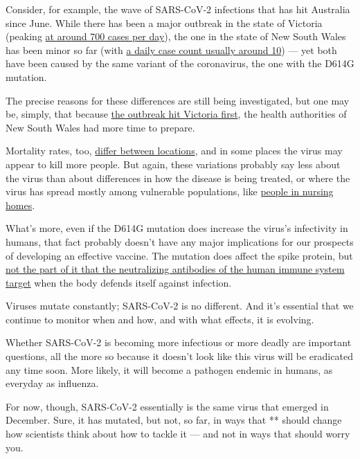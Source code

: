 Consider, for example, the wave of SARS-CoV-2 infections that has hit
Australia since June. While there has been a major outbreak in the state
of Victoria (peaking \href{https://www.covid19data.com.au/victoria}{at
around 700 cases per day}), the one in the state of New South Wales has
been minor so far (with
\href{https://www.covid19data.com.au/transmission-sources-states}{a
daily case count usually around 10}) --- yet both have been caused by
the same variant of the coronavirus, the one with the D614G mutation.

The precise reasons for these differences are still being investigated,
but one may be, simply, that because
\href{https://www.theguardian.com/australia-news/2020/aug/28/victoria-covid-hotel-quarantine-inquiry-hears-guest-escaped-to-lobby-as-security-guard-was-on-his-phone}{the
outbreak hit Victoria first}, the health authorities of New South Wales
had more time to prepare.

Mortality rates, too,
\href{https://www.worldometers.info/coronavirus/}{differ between
locations}, and in some places the virus may appear to kill more people.
But again, these variations probably say less about the virus than about
differences in how the disease is being treated, or where the virus has
spread mostly among vulnerable populations, like
\href{https://www.theguardian.com/australia-news/2020/sep/07/revealed-more-than-40-of-victorian-coronavirus-aged-care-deaths-were-residents-in-just-10-homes}{people
in nursing homes}.

What's more, even if the D614G mutation does increase the virus's
infectivity in humans, that fact probably doesn't have any major
implications for our prospects of developing an effective vaccine. The
mutation does affect the spike protein, but
\href{https://www.pnas.org/content/early/2020/08/28/2008281117}{not the
part of it that the neutralizing antibodies of the human immune system
target} when the body defends itself against infection.

Viruses mutate constantly; SARS-CoV-2 is no different. And it's
essential that we continue to monitor when and how, and with what
effects, it is evolving.

Whether SARS-CoV-2 is becoming more infectious or more deadly are
important questions, all the more so because it doesn't look like this
virus will be eradicated any time soon. More likely, it will become a
pathogen endemic in humans, as everyday as influenza.

For now, though, SARS-CoV-2 essentially is the same virus that emerged
in December. Sure, it has mutated, but not, so far, in ways that **
should change how scientists think about how to tackle it --- and not in
ways that should worry you.

